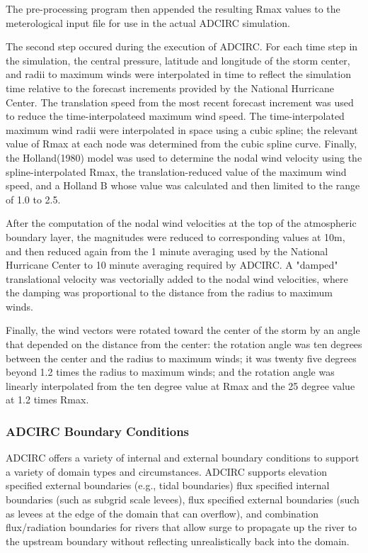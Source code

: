 \documentclass[12pt]{article}
\begin{document}
The pre-processing program then appended the resulting Rmax values 
to the meterological input file for use in the actual ADCIRC 
simulation.

The second step occured during the execution of ADCIRC. For each 
time step in the simulation, the central pressure, latitude and 
longitude of the storm center, and radii to maximum winds were 
interpolated in time to reflect the simulation time relative to the 
forecast increments provided by the National Hurricane Center. The 
translation speed from the most recent forecast increment was used 
to reduce the time-interpolateed maximum wind speed. The 
time-interpolated maximum wind radii were interpolated in space 
using a cubic spline; the relevant value of Rmax at each node was 
determined from the cubic spline curve. Finally, the Holland(1980) 
model was used to determine the nodal wind velocity using the 
spline-interpolated Rmax, the translation-reduced value of the 
maximum wind speed, and a Holland B whose value was calculated and 
then limited to the range of 1.0 to 2.5.

After the computation of the nodal wind velocities at the top of the 
atmospheric boundary layer, the magnitudes were reduced to 
corresponding values at 10m, and then reduced again from the 1 
minute averaging used by the National Hurricane Center to 10 minute 
averaging required by ADCIRC. A "damped" translational velocity was 
vectorially added to the nodal wind velocities, where the damping 
was proportional to the distance from the radius to maximum winds.

Finally, the wind vectors were rotated toward the center of the 
storm by an angle that depended on the distance from the center: the 
rotation angle was ten degrees between the center and the radius to 
maximum winds; it was twenty five degrees beyond 1.2 times the 
radius to maximum winds; and the rotation angle was linearly 
interpolated from the ten degree value at Rmax and the 25 degree 
value at 1.2 times Rmax.

\subsubsection{ADCIRC Boundary Conditions}

ADCIRC offers a variety of internal and external boundary conditions 
to support a variety of domain types and circumstances. ADCIRC 
supports elevation specified external boundaries (e.g., tidal 
boundaries) flux specified internal boundaries (such as subgrid 
scale levees), flux specified external boundaries (such as levees at 
the edge of the domain that can overflow), and combination 
flux/radiation boundaries for rivers that allow surge to propagate 
up the river to the upstream boundary without reflecting 
unrealistically back into the domain.
\end{document}
